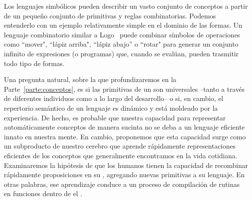 
Los lenguajes simbólicos pueden describir un vasto conjunto de conceptos a partir de un pequeño conjunto de primitivas y reglas combinatorias. Podemos entenderlo con un ejemplo relativamente simple en el dominio de las formas. Un lenguaje combinatorio similar a Logo~\cite{abelson1974logo} puede combinar símbolos de operaciones como ``mover", ``lápiz arriba", ``lápiz abajo'' o ``rotar" para generar un conjunto infinito de expresiones (o programas) que, cuando se evalúan, pueden trasmitir todo tipo de formas.

Una pregunta natural, sobre la que profundizaremos en la Parte~\ref{parte:conceptos}, es si las primitivas de un \lot son universales --tanto a través de diferentes individuos como a lo largo del desarrollo-- o si, en cambio, el repertorio semántico de un lenguaje es dinámico y está moldeado por la experiencia. De hecho, es probable que nuestra capacidad para representar automáticamente conceptos de manera sucinta no se deba a un lenguaje eficiente innato en nuestra mente. En cambio, proponemos que esta capacidad surge como un subproducto de nuestro cerebro que aprende rápidamente representaciones eficientes de los conceptos que generalmente encontramos en la vida cotidiana. Examinaremos la hipótesis de que los humanos tienen la capacidad de recombinar rápidamente proposiciones en su \lot, agregando nuevas primitivas a su lenguaje. En otras palabras, ese aprendizaje conduce a un proceso de compilación de rutinas en funciones dentro de el \lot.

